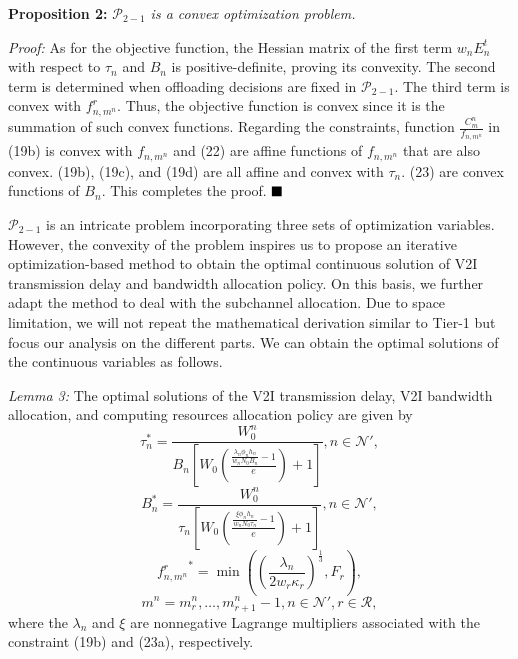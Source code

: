 \documentclass[lettersize,journal]{IEEEtran}
\begin{document}
\vspace{-0.5cm}
\textbf{Proposition 2:} \textit{$\mathcal{P}_{2-1}$ is a convex optimization problem.}

\emph{Proof:} As for the objective function, the Hessian matrix of the first term $w_n E^t_{n}$ with respect to $\tau_{n}$ and $B_n$ is positive-definite, proving its convexity. The second term is determined when offloading decisions are fixed in $\mathcal{P}_{2-1}$. The third term is convex with $f^{r}_{n,m^n}$. Thus, the objective function is convex since it is the summation of such convex functions. Regarding the constraints, function $\frac{C^n_m}{f_{n,m^n}}$ in (19b) is convex with $f_{n,m^n}$ and (22) are affine functions of $f_{n,m^n}$ that are also convex. (19b), (19c), and (19d) are all affine and convex with $\tau_{n}$. (23) are convex functions of $B_n$. This completes the proof.
$\hfill\blacksquare$

$\mathcal{P}_{2-1}$ is an intricate problem incorporating three sets of optimization variables. However, the convexity of the problem inspires us to propose an iterative optimization-based method to obtain the optimal continuous solution of V2I transmission delay and bandwidth allocation policy. On this basis, we further adapt the method to deal with the subchannel allocation. Due to space limitation, we will not repeat the mathematical derivation similar to Tier-1 but focus our analysis on the different parts. We can obtain the optimal solutions of the continuous variables as follows.

\emph{Lemma 3:} The optimal solutions of the V2I transmission delay, V2I bandwidth allocation, and computing resources allocation policy are given by
\begin{equation*}
\tau^*_{n}=\frac {W^{n}_{0}}{B_{n} \left [{W_{0} \left ({\frac {\frac{\lambda_n \phi_n h_n}{w_n N_0 B_{n}}-1}{e}}\right)+1 }\right]}, n \in \mathcal{N'}, \tag{24a}
\end{equation*}
\begin{equation*}
B^*_{n}=\frac {W^{n}_{0}}{\tau_{n} \left [{W_{0} \left ({\frac {\frac{\xi \phi_n h_n}{w_n N_0 \tau_{n}}-1}{e}}\right)+1 }\right]}, n \in \mathcal{N'}, \tag{24b}
\end{equation*}
\begin{equation*}
{f^{r}_{n,m^n}}^*=\min \left ({\left ({\frac {\lambda_n}{2w_r\kappa _{r}}}\right)^{\frac {1}{3}}, F_r}\right),
\end{equation*}
\begin{equation*}
m^n=m^n_r,\ldots, m^n_{r+1}-1, n\in \mathcal{N'}, r\in \mathcal{R}, \tag{24c}
\end{equation*}
where the $\lambda_n$ and $\xi$ are nonnegative Lagrange multipliers associated with the constraint (19b) and (23a), respectively.
\end{document}
